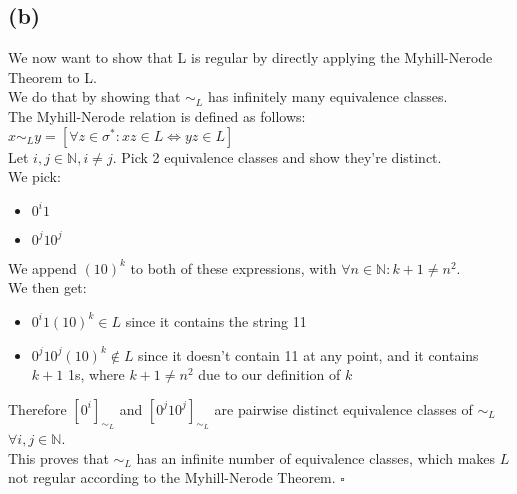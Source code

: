 \subsection{(b)}
We now want to show that L is regular by directly applying the Myhill-Nerode Theorem to L.\\
We do that by showing that $\sim_{L}$ has infinitely many equivalence classes.\\
The Myhill-Nerode relation is defined as follows:\\
$x\sim_{L}y= [\forall z \in \sigma^{\ast}: xz \in L \Leftrightarrow yz \in L]$\\
Let $i,j \in \mathbb{N}, i \neq j$. Pick 2 equivalence classes and show they're distinct.\\
We pick:
\vspace{-5mm}
\begin{itemize}
    \item $0^{i}1$
    \item $0^{j}10^{j}$
\end{itemize}
\vspace{-5mm}
We append $(10)^{k}$ to both of these expressions, with $\forall n \in \mathbb{N}: k+1 \neq n^{2}$.\\
We then get:
\vspace{-5mm}
\begin{itemize}
    \item $0^{i}1(10)^k \in L$ since it contains the string 11
    \item $0^{j}10^{j}(10)^k \notin L$ since it doesn't contain 11 at any point, and it contains $k+1$ 1s, where $k+1 \neq n^{2}$ due to our definition of $k$
\end{itemize}
\vspace{-5mm}
Therefore $[0^{i}]_{\sim_{L}}$ and $[0^{j}10^{j}]_{\sim_{L}}$ are pairwise distinct equivalence classes of $\sim_{L}$ $\forall i,j \in \mathbb{N}$.\\
This proves that $\sim_{L}$ has an infinite number of equivalence classes, which makes $L$ not regular according to the Myhill-Nerode Theorem. $\square$



